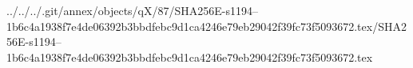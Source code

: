 ../../../.git/annex/objects/qX/87/SHA256E-s1194--1b6c4a1938f7e4de06392b3bbdfebc9d1ca4246e79eb29042f39fc73f5093672.tex/SHA256E-s1194--1b6c4a1938f7e4de06392b3bbdfebc9d1ca4246e79eb29042f39fc73f5093672.tex